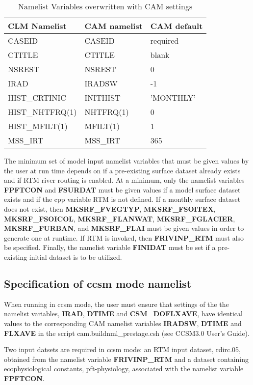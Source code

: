 \begin{longtable}{|l|l|l|}
\caption{\label{environment_vars} Namelist Variables overwritten with CAM settings} \\
\hline
CLM Namelist & CAM namelist & CAM default \\ \hline \hline
CASEID & CASEID & required \\ \hline
CTITLE & CTITLE & blank \\ \hline
NSREST & NSREST & 0 \\ \hline
IRAD & IRADSW  & -1 \\ \hline
HIST\_CRTINIC & INITHIST & 'MONTHLY' \\ \hline
HIST\_NHTFRQ(1) & NHTFRQ(1) & 0 \\ \hline
HIST\_MFILT(1) & MFILT(1) & 1 \\ \hline
MSS\_IRT & MSS\_IRT & 365 \\ \hline
\end{longtable}

The minimum set of model input namelist variables that must be given
values by the user at run time depends on if a pre-existing surface
dataset already exists and if RTM river routing is enabled.  At a
minimum, only the namelist variables {\bf FPFTCON} and {\bf FSURDAT}
must be given values if a model surface dataset exists and if the cpp
variable RTM is not defined. If a monthly surface dataset does not
exist, then {\bf MKSRF\_FVEGTYP}, {\bf MKSRF\_FSOITEX}, {\bf
MKSRF\_FSOICOL}, {\bf MKSRF\_FLANWAT}, {\bf MKSRF\_FGLACIER}, {\bf
MKSRF\_FURBAN}, and {\bf MKSRF\_FLAI} must be given values in order to
generate one at runtime.  If RTM is invoked, then {\bf FRIVINP\_RTM}
must also be specified.  Finally, the namelist variable {\bf FINIDAT}
must be set if a pre-existing initial dataset is to be utilized.


\subsection {Specification of ccsm mode namelist}
\label{subsec_ccsm_namelist}

When running in ccsm mode, the user must ensure that settings of the
the namelist variables, {\bf IRAD}, {\bf DTIME} and {\bf
CSM\_DOFLXAVE}, have identical values to the corresponding CAM
namelist variables {\bf IRADSW}, {\bf DTIME} and {\bf FLXAVE}
in the script cam.buildnml\_prestage.csh (see CCSM3.0 User's Guide).

Two input datsets are required in ccsm mode: an RTM input dataset,
rdirc.05, obtained from the namelist variable {\bf FRIVINP\_RTM} and
a dataset containing ecophysiological constants, pft-physiology,
associated with the namelist variable {\bf FPFTCON}.

